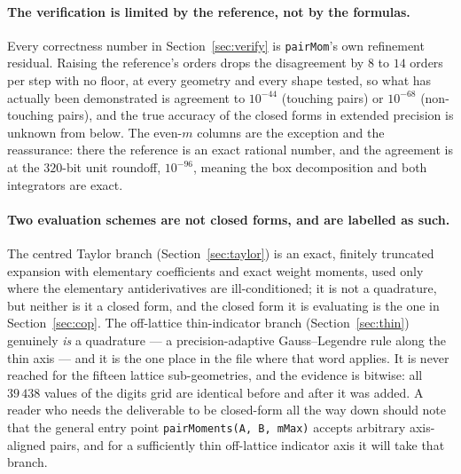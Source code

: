 \documentclass[11pt]{article}
\theoremstyle{remark}
\newcommand{\code}[1]{\texttt{#1}}
\begin{document}
\paragraph{The verification is limited by the reference, not by the formulas.} Every
correctness number in Section~\ref{sec:verify} is \code{pairMom}'s own refinement residual.
Raising the reference's orders drops the disagreement by $8$ to $14$ orders per step with
no floor, at every geometry and every shape tested, so what has actually been demonstrated
is agreement to $10^{-44}$ (touching pairs) or $10^{-68}$ (non-touching pairs), and the
true accuracy of the closed forms in extended precision is unknown from below. The
even-$m$ columns are the exception and the reassurance: there the reference is an exact
rational number, and the agreement is at the $320$-bit unit roundoff, $10^{-96}$, meaning
the box decomposition and both integrators are exact.

\paragraph{Two evaluation schemes are not closed forms, and are labelled as such.} The
centred Taylor branch (Section~\ref{sec:taylor}) is an exact, finitely truncated expansion
with elementary coefficients and exact weight moments, used only where the elementary
antiderivatives are ill-conditioned; it is not a quadrature, but neither is it a closed
form, and the closed form it is evaluating is the one in Section~\ref{sec:cop}. The
off-lattice thin-indicator branch (Section~\ref{sec:thin}) genuinely \emph{is} a
quadrature --- a precision-adaptive Gauss--Legendre rule along the thin axis --- and it is
the one place in the file where that word applies. It is never reached for the fifteen
lattice sub-geometries, and the evidence is bitwise: all $39\,438$ values of the digits
grid are identical before and after it was added. A reader who needs the deliverable to be
closed-form all the way down should note that the general entry point
\code{pairMoments(A, B, mMax)} accepts arbitrary axis-aligned pairs, and for a
sufficiently thin off-lattice indicator axis it will take that branch.
\end{document}
